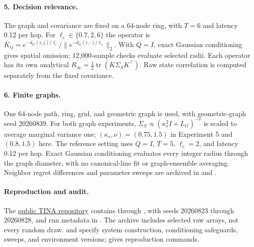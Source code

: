 \paragraph{5. Decision relevance.}
The graph and covariance are fixed on a 64-node ring, with $T=6$ and latency
0.12 per hop. For $\ell_c\in\{0.7,2,6\}$ the operator is
$K_{ij}=e^{-d_G(i,j)/\ell_c}/\|e^{-d_G(i,\cdot)/\ell_c}\|_2$.
With $Q=I$, exact Gaussian conditioning gives spatial omission; 12,000-sample
checks evaluate selected radii. Each operator has its own analytical
$R_\infty=\tfrac12\operatorname{tr}(K\Sigma_S K^\top)$.
Raw state correlation is computed separately from the fixed covariance.

\paragraph{6. Finite graphs.}
One 64-node path, ring, grid, and geometric graph is used, with geometric-graph
seed 20260839. For both graph experiments,
$\Sigma_S\propto(\kappa_s^2I+L_G)^{-\nu}$ is scaled to average marginal
variance one; $(\kappa_s,\nu)=(0.75,1.5)$ in Experiment 5 and $(0.8,1.5)$
here. The reference setting uses $Q=I$, $T=5$, $\ell_c=2$, and latency 0.12
per hop. Exact Gaussian conditioning evaluates every integer radius through
the graph diameter, with no canonical-line fit or graph-ensemble averaging.
Neighbor regret differences and parameter sweeps are archived in
 and
.

\paragraph{Reproduction and audit.}
The \href{https://github.com/ANRGUSC/TINA}{public TINA repository} contains
 through
, with seeds 20260823 through 20260828,
and run metadata in .
The archive includes selected raw arrays, not every random draw.
 and 
specify system construction, conditioning safeguards, sweeps, and environment
versions;  gives reproduction commands.
